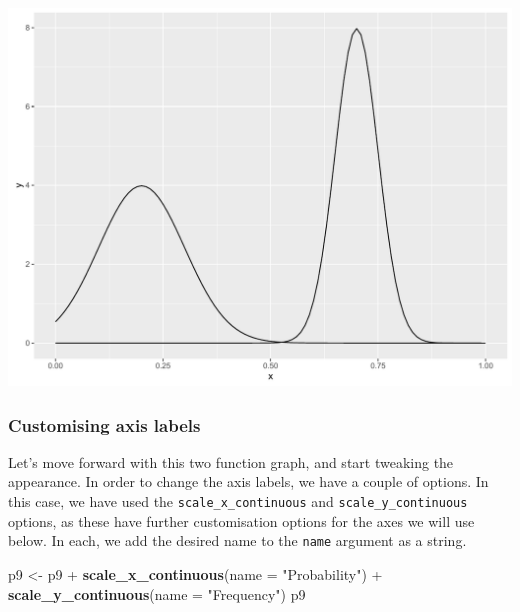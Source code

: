 \documentclass[]{article}
\newenvironment{Shaded}{\begin{snugshade}}{\end{snugshade}}
\newcommand{\KeywordTok}[1]{\textcolor[rgb]{0.13,0.29,0.53}{\textbf{{#1}}}}
\newcommand{\DataTypeTok}[1]{\textcolor[rgb]{0.13,0.29,0.53}{{#1}}}
\newcommand{\StringTok}[1]{\textcolor[rgb]{0.31,0.60,0.02}{{#1}}}
\newcommand{\NormalTok}[1]{{#1}}
\begin{document}
\begin{center}\includegraphics{0_all_posts_pdf/function_4-1} \end{center}

\subsubsection{Customising axis labels}\label{customising-axis-labels-2}

Let's move forward with this two function graph, and start tweaking the
appearance. In order to change the axis labels, we have a couple of
options. In this case, we have used the \texttt{scale\_x\_continuous}
and \texttt{scale\_y\_continuous} options, as these have further
customisation options for the axes we will use below. In each, we add
the desired name to the \texttt{name} argument as a string.

\begin{Shaded}
\begin{Highlighting}[]
\NormalTok{p9 <-}\StringTok{ }\NormalTok{p9 +}\StringTok{ }\KeywordTok{scale_x_continuous}\NormalTok{(}\DataTypeTok{name =} \StringTok{"Probability"}\NormalTok{) +}
\StringTok{      }\KeywordTok{scale_y_continuous}\NormalTok{(}\DataTypeTok{name =} \StringTok{"Frequency"}\NormalTok{)}
\NormalTok{p9}
\end{Highlighting}
\end{Shaded}
\end{document}
